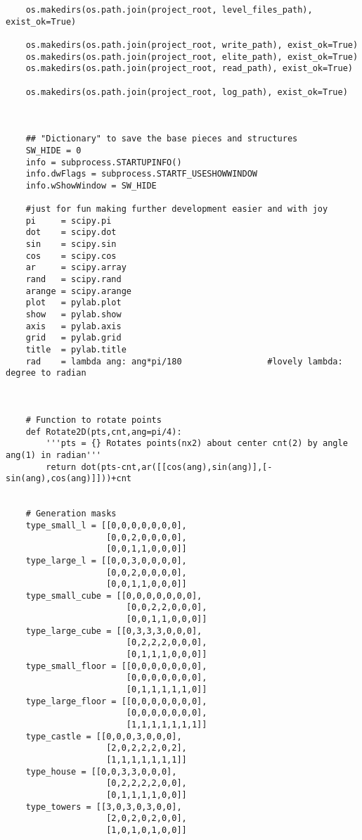 \begin{verbatim}
    os.makedirs(os.path.join(project_root, level_files_path), exist_ok=True)

    os.makedirs(os.path.join(project_root, write_path), exist_ok=True)
    os.makedirs(os.path.join(project_root, elite_path), exist_ok=True)
    os.makedirs(os.path.join(project_root, read_path), exist_ok=True)

    os.makedirs(os.path.join(project_root, log_path), exist_ok=True)



    ## "Dictionary" to save the base pieces and structures
    SW_HIDE = 0
    info = subprocess.STARTUPINFO()
    info.dwFlags = subprocess.STARTF_USESHOWWINDOW
    info.wShowWindow = SW_HIDE

    #just for fun making further development easier and with joy
    pi     = scipy.pi
    dot    = scipy.dot
    sin    = scipy.sin
    cos    = scipy.cos
    ar     = scipy.array
    rand   = scipy.rand
    arange = scipy.arange
    plot   = pylab.plot
    show   = pylab.show
    axis   = pylab.axis
    grid   = pylab.grid
    title  = pylab.title
    rad    = lambda ang: ang*pi/180                 #lovely lambda: degree to radian



    # Function to rotate points
    def Rotate2D(pts,cnt,ang=pi/4):
        '''pts = {} Rotates points(nx2) about center cnt(2) by angle ang(1) in radian'''
        return dot(pts-cnt,ar([[cos(ang),sin(ang)],[-sin(ang),cos(ang)]]))+cnt


    # Generation masks
    type_small_l = [[0,0,0,0,0,0,0],
                    [0,0,2,0,0,0,0],
                    [0,0,1,1,0,0,0]]
    type_large_l = [[0,0,3,0,0,0,0],
                    [0,0,2,0,0,0,0],
                    [0,0,1,1,0,0,0]]
    type_small_cube = [[0,0,0,0,0,0,0],
                        [0,0,2,2,0,0,0],
                        [0,0,1,1,0,0,0]]
    type_large_cube = [[0,3,3,3,0,0,0],
                        [0,2,2,2,0,0,0],
                        [0,1,1,1,0,0,0]]
    type_small_floor = [[0,0,0,0,0,0,0],
                        [0,0,0,0,0,0,0],
                        [0,1,1,1,1,1,0]]
    type_large_floor = [[0,0,0,0,0,0,0],
                        [0,0,0,0,0,0,0],
                        [1,1,1,1,1,1,1]]
    type_castle = [[0,0,0,3,0,0,0],
                    [2,0,2,2,2,0,2],
                    [1,1,1,1,1,1,1]]
    type_house = [[0,0,3,3,0,0,0],
                    [0,2,2,2,2,0,0],
                    [0,1,1,1,1,0,0]]
    type_towers = [[3,0,3,0,3,0,0],
                    [2,0,2,0,2,0,0],
                    [1,0,1,0,1,0,0]]


\end{verbatim}
